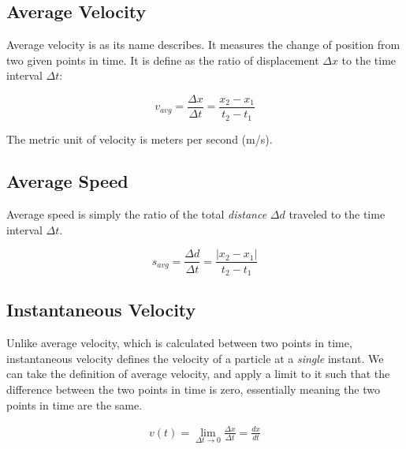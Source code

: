 \documentclass[11pt]{report}
\begin{document}
\subsection{Average Velocity}

Average velocity is as its name describes. It measures the change of position from two given points in time. It is define as the ratio of displacement $\Delta x$ to the time interval $\Delta t$:

\begin{equation*}
    v_{avg} = \frac{\Delta x}{\Delta t} = \frac{x_{2} - x_{1}}{t_{2} - t_{1}}
\end{equation*}

The metric unit of velocity is meters per second (m/s). 


\subsection{Average Speed}

Average speed is simply the ratio of the total \textit{distance} $\Delta d$ traveled to the time interval $\Delta t$.

\begin{equation*}
    s_{avg} = \frac{\Delta d}{\Delta t} = \frac{|x_{2} - x_{1}|}{t_{2} - t_{1}}
\end{equation*}

\subsection{Instantaneous Velocity}

Unlike average velocity, which is calculated between two points in time, instantaneous velocity defines the velocity of a particle at a \textit{single} instant. We can take the definition of average velocity, and apply a limit to it such that the difference between the two points in time is zero, essentially meaning the two points in time are the same.

\begin{align*}
    v(t) = \lim_{\Delta t \to 0} \frac{\Delta x}{\Delta t} = \frac{dx}{dt}
\end{align*}
\end{document}
